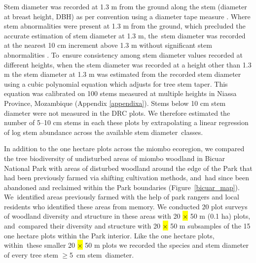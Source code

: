 \documentclass[diversity,article,accept,moreauthors,pdftex]{Definitions/mdpi}
\newcommand{\nplotsbicuar}{15}
\newcommand{\ndegradplots}{20}
\begin{document}
Stem diameter was recorded at 1.3 m from the ground along the stem (diameter at breast height, DBH) as per convention using a diameter tape measure \citep{Kershaw2017}. Where stem abnormalities were present at 1.3 m from the ground, which precluded the accurate estimation of stem diameter at 1.3 m, the~stem diameter was recorded at the nearest 10 cm increment above 1.3 m without significant stem abnormalities \citep{Kershaw2017}. To~ensure consistency among stem diameter values recorded at different heights, when the stem diameter was recorded at a height other than 1.3 m the stem diameter at 1.3 m was estimated from the recorded stem diameter using a cubic polynomial equation which adjusts for tree stem taper. This equation was calibrated on 100 stems measured at multiple heights in Niassa Province, Mozambique (Appendix \ref{appendixa}). Stems below 10 cm stem diameter were not measured in the DRC plots. We therefore estimated the number of 5--10 cm stems in each these plots by extrapolating a linear regression of log stem abundance across the available stem diameter~classes.

In addition to the one hectare plots across the miombo ecoregion, we compared the tree biodiversity of undisturbed areas of miombo woodland in Bicuar National Park with areas of disturbed woodland around the edge of the Park that had been previously farmed via shifting cultivation methods, and~had since been abandoned and reclaimed within the Park boundaries (Figure~\ref{bicuar_map}). We~identified areas previously farmed with the help of park rangers and local residents who identified these areas from memory. We conducted \ndegradplots{} plot surveys of woodland diversity and structure in these areas with 20 \hl{$\times$} %
50 m (0.1 ha) plots, and~compared their diversity and structure with 20 \hl{$\times$} 50 m subsamples of the \nplotsbicuar{} one hectare plots within the Park interior. Like the one hectare plots, within~these smaller 20 \hl{$\times$} 50 m plots we recorded the species and stem diameter of every tree stem $\ge$5~cm stem~diameter.
\end{document}
